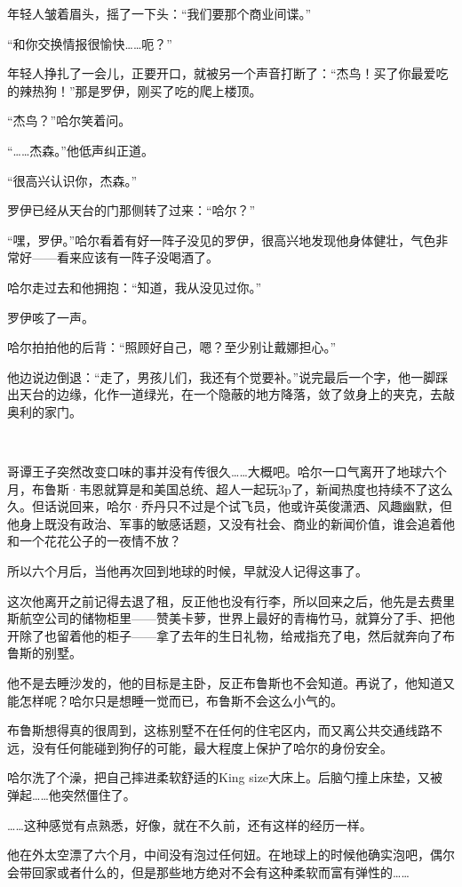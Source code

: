 \documentclass[../main.tex]{subfiles}
\begin{document}
年轻人皱着眉头，摇了一下头：“我们要那个商业间谍。”

“和你交换情报很愉快……呃？”

年轻人挣扎了一会儿，正要开口，就被另一个声音打断了：“杰鸟！买了你最爱吃的辣热狗！”那是罗伊，刚买了吃的爬上楼顶。

“杰鸟？”哈尔笑着问。

“……杰森。”他低声纠正道。

“很高兴认识你，杰森。”

罗伊已经从天台的门那侧转了过来：“哈尔？”

“嘿，罗伊。”哈尔看着有好一阵子没见的罗伊，很高兴地发现他身体健壮，气色非常好——看来应该有一阵子没喝酒了。

哈尔走过去和他拥抱：“知道，我从没见过你。”

罗伊咳了一声。

哈尔拍拍他的后背：“照顾好自己，嗯？至少别让戴娜担心。”

他边说边倒退：“走了，男孩儿们，我还有个觉要补。”说完最后一个字，他一脚踩出天台的边缘，化作一道绿光，在一个隐蔽的地方降落，敛了敛身上的夹克，去敲奥利的家门。

~\

哥谭王子突然改变口味的事并没有传很久……大概吧。哈尔一口气离开了地球六个月，布鲁斯·韦恩就算是和美国总统、超人一起玩3p了，新闻热度也持续不了这么久。但话说回来，哈尔·乔丹只不过是个试飞员，他或许英俊潇洒、风趣幽默，但他身上既没有政治、军事的敏感话题，又没有社会、商业的新闻价值，谁会追着他和一个花花公子的一夜情不放？

所以六个月后，当他再次回到地球的时候，早就没人记得这事了。

这次他离开之前记得去退了租，反正他也没有行李，所以回来之后，他先是去费里斯航空公司的储物柜里——赞美卡萝，世界上最好的青梅竹马，就算分了手、把他开除了也留着他的柜子——拿了去年的生日礼物，给戒指充了电，然后就奔向了布鲁斯的别墅。

他不是去睡沙发的，他的目标是主卧，反正布鲁斯也不会知道。再说了，他知道又能怎样呢？哈尔只是想睡一觉而已，布鲁斯不会这么小气的。

布鲁斯想得真的很周到，这栋别墅不在任何的住宅区内，而又离公共交通线路不远，没有任何能碰到狗仔的可能，最大程度上保护了哈尔的身份安全。

哈尔洗了个澡，把自己摔进柔软舒适的King
size大床上。后脑勺撞上床垫，又被弹起……他突然僵住了。

……这种感觉有点熟悉，好像，就在不久前，还有这样的经历一样。

他在外太空漂了六个月，中间没有泡过任何妞。在地球上的时候他确实泡吧，偶尔会带回家或者什么的，但是那些地方绝对不会有这种柔软而富有弹性的……
\end{document}
